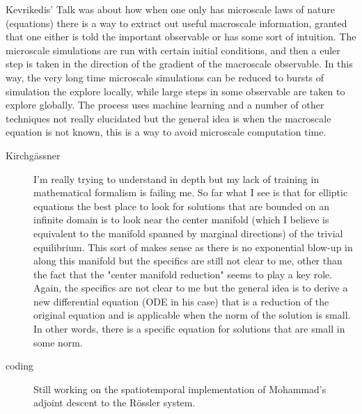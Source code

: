 \begin{description}
{Kevrikedis' Talk was about how when one only has microscale laws of nature (equations) there is a way to
extract out useful macroscale information, granted that one either is told the important observable or
has some sort of intuition. The microscale simulations are run with certain initial conditions, and then
a euler step is taken in the direction of the gradient of the macroscale observable. In this way,
the very long time microscale simulations can be reduced to bursts of simulation the explore locally, while
large steps in some observable are taken to explore globally. The process uses machine learning and a number
of other techniques not really elucidated but the general idea is when the macroscale equation is not known,
this is a way to avoid microscale computation time.

\begin{description}
\item[Kirchg\"assner]
I'm really trying to understand  in depth but my lack of training
in mathematical formalism is failing me. So far what I see is that for elliptic equations the best
place to look for solutions that are bounded on an infinite domain is to look near the center manifold
(which I believe is equivalent to the manifold spanned by marginal directions)
of the trivial equilibrium. This sort of makes sense as there is no exponential blow-up in {\statesp}
along this manifold but the specifics are still not clear to me, other than the fact that the "center manifold
reduction" seems to play a key role. Again, the specifics are not clear to me but the general idea is to
derive a new differential equation (ODE in his case) that is a reduction of the original equation and
is applicable when the norm of the solution is small. In other words, there is a specific equation for
solutions that are small in some norm.

\item[coding]
Still working on the spatiotemporal implementation of Mohammad's adjoint descent to the R\"ossler system.

\end{description}

}

\end{description}
